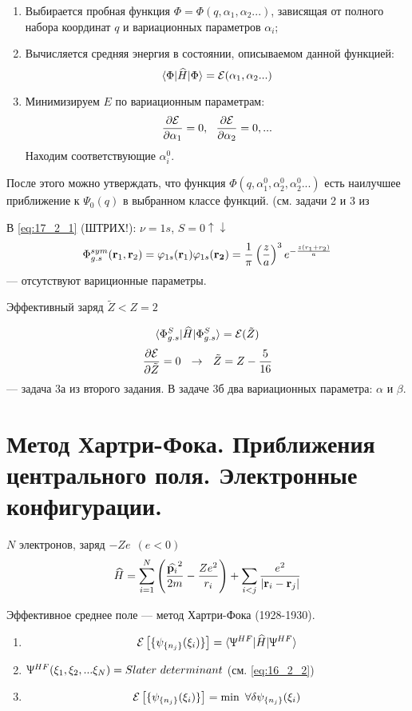 \begin{enumerate}
\item Выбирается пробная функция $\Phi = \Phi(q, \alpha_1, \alpha_2 ... )$, зависящая от полного набора координат $q$ и вариационных параметров $\alpha_i$;
\item Вычисляется средняя энергия в состоянии, описываемом данной функцией:
$$
\langle{\Phi}|{\widehat{H}}|{\Phi}\rangle = \mathcal{E}(\alpha_1, \alpha_2 ...)
$$
\item Минимизируем $E$ по вариационным параметрам:
$$
\frac{\partial{\mathcal{E}}}{\partial{\alpha_1}} = 0,~~ \frac{\partial{\mathcal{E}}}{\partial{\alpha_2}} = 0, ... 
$$
Находим соответствующие $\alpha_i^0$.
\end{enumerate}
После этого можно утверждать, что функция $\Phi(q, \alpha_1^0, \alpha_2^0, \alpha_2^0 ...)$ есть наилучшее приближение к $\Psi_0(q)$ в выбранном классе функций. (см. задачи 2 и 3 из

В \eqref{eq:17_2_1} (ШТРИХ!): $\nu = 1s$, $S = 0 \uparrow \downarrow$
$$
\Phi_{g.s}^{sym}(\mathbf{r}_1, \mathbf{r}_2) = \varphi_{1s}(\mathbf{r}_1)\varphi_{1s}(\mathbf{r_2}) = \frac{1}{\pi} \left ( {\frac{z}{a}} \right )^3 e^{-\frac{z(r_1 + r_2)}{a}}
$$
--- отсутствуют вариционные параметры.

Эффективный заряд $\tilde{Z} < Z = 2$

$$
\langle{\Phi_{g.s}^{S}}|{\widehat{H}}|{\Phi_{g.s}^{S}}\rangle = \mathcal{E}(\tilde{Z})
$$
$$
\frac{\partial{\mathcal{E}}}{\partial{\tilde{Z}}} = 0 ~~\to~~ \tilde{Z} = Z - \frac{5}{16}
$$
--- задача 3а из второго задания. В задаче 3б два вариационных параметра: $\alpha$ и $\beta$.

\section{Метод Хартри-Фока. Приближения центрального поля. Электронные конфигурации.}
$N$ электронов, заряд $-Ze~~ (e<0)$
\begin{equation}
\label{eq:18_2_1}
\widehat{H} = \sum_{i=1}^{N} \left ( {\frac{\widehat{\mathbf{p}_i}^2}{2m} - \frac{Ze^2}{r_i}} \right ) + \sum_{i<j} \frac{e^2}{\left\lvert{\mathbf{r}_i - \mathbf{r}_j}\right\rvert}
\end{equation}

Эффективное среднее поле --- метод Хартри-Фока (1928-1930).

\begin{enumerate}
\item \begin{equation}
\label{eq:18_2_2}
\mathcal{E}\left [ {\{\psi_{\{n_j\}}(\xi_i)\}} \right ] = \langle{\Uppsi^{HF}}|{\widehat{H}}|{\Uppsi^{HF}}\rangle
\end{equation}

\item $\Uppsi^{HF}(\xi_1, \xi_2, ... \xi_N) = Slater~determinant$ (см. \eqref{eq:16_2_2})

\item 
$$
\mathcal{E}\left [ {\{\psi_{\{n_j\}}(\xi_i)\}} \right ] = \min~ \forall \delta\psi_{\{n_j\}}(\xi_i)
$$
\end{enumerate}

